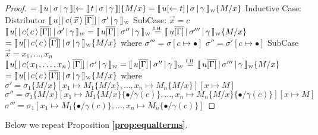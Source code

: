 \documentclass[a4paper,UKenglish,cleveref, autoref]{lipics-v2019}
\newcommand{\share}[3]{#1 [#2 \leftarrow #3]}
\newcommand{\dist}[5]{#1 [ #2 \, \vert \, \fakedist{#4}{#5} \, #3 ]}
\newcommand{\fakedist}[2]{#1 \langle \, #2 \, \rangle}
\newcommand{\sub}[3]{#1 \{ #2 / #3 \}}
\newcommand{\weaksymbol}{\mbox{\tiny $\mathcal{W}$}}
\newcommand{\readbackwmap}[3]{\llbracket \, #1 \, \vert \, #2 \, \vert \, #3  \, \rrbracket }
\newcommand{\readweakwmap}[3]{\llbracket \, #1 \, \vert \, #2 \, \vert \, #3  \, \rrbracket_{\weaksymbol} }
\newcommand{\IH}{\stackrel{\hbox{\tiny I.H.}}{\hbox{=}}}
\begin{document}
\begin{proof}
\newline
$= \share{\readbackwmap{u}{\sigma}{\gamma}}{}{\readbackwmap{t}{\sigma}{\gamma}}  \sub{}{M}{x} = \readweakwmap{\share{u}{}{t}}{\sigma}{\gamma} \sub{}{M}{x}$
\newline
\newline
Inductive Case: Distributor
\newline
$\readweakwmap{\dist{u}{}{\overline{[\Gamma]}}{c}{\vec{x}}}{\sigma'}{\gamma}$
\newline
\newline
\indent SubCase: $\vec{x} = c$
\newline
$\readweakwmap{\dist{u}{}{\overline{[\Gamma]}}{c}{c}}{\sigma'}{\gamma} = \readweakwmap{u \overline{[\Gamma]}}{\sigma''}{\gamma} \IH \readweakwmap{u \overline{[\Gamma]}}{\sigma'''}{\gamma} \sub{}{M}{x}$
\newline
$ = \readweakwmap{\dist{u}{}{\overline{[\Gamma]}}{c}{c}}{\sigma}{\gamma}  \sub{}{M}{x}$
\newline
where
\newline
$\sigma''' = \sigma [c \mapsto \bullet]$
\newline
$\sigma'' = \sigma' [c \mapsto \bullet]$
\newline
\newline
\indent SubCase $\vec{x} = x_{1}, \dots, x_{n}$
\newline
$\readweakwmap{\dist{u}{}{\overline{[\Gamma]}}{c}{x_{1}, \dots, x_{n}}}{\sigma'}{\gamma} = \readweakwmap{u \overline{[\Gamma]}}{\sigma''}{\gamma} \IH \readweakwmap{u \overline{[\Gamma]}}{\sigma'''}{\gamma} \sub{}{M}{x}$
\newline
$ = \readweakwmap{\dist{u}{}{\overline{[\Gamma]}}{c}{c}}{\sigma}{\gamma}  \sub{}{M}{x}$
\newline
where
\newline
$\sigma' = \sigma_{1}\sub{}{M}{x} [x_{1} \mapsto M_{1}\sub{}{M}{x}, \dots, x_{n} \mapsto M_{n}\sub{}{M}{x}] [x \mapsto M]$
\newline
$\sigma'' = \sigma_{1}\sub{}{M}{x} [x_{1} \mapsto M_{1}\sub{}{M}{x} \sub{}{\bullet}{\gamma(c)}, \dots, x_{n} \mapsto M_{n} \sub{}{M}{x} \sub{}{\bullet}{\gamma(c)}] [x \mapsto M]$
\newline
$\sigma''' = \sigma_{1} [x_{1} \mapsto M_{1} \sub{}{\bullet}{\gamma(c)}, \dots, x_{n} \mapsto M_{n} \sub{}{\bullet}{\gamma(c)}]$
\end{proof}

\noindent Below we repeat Proposition {\bf \ref{prop:equalterms}}.
\end{document}

